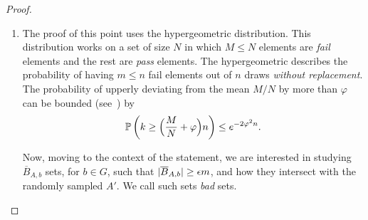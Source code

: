 \begin{lemma}
\begin{enumerate}[label={\Roman*}., ref={\Roman*}, font=\rmfamily]
            \end{enumerate}
            \begin{proof}
            \begin{enumerate}[label={\Roman*}., ref={\Roman*}, font=\rmfamily]
                \item The proof of this point uses the hypergeometric distribution.
                    This distribution works on a set of size $N$ in which $M \leq N$ elements are \emph{fail} elements
                    and the rest are \emph{pass} elements.
                    The hypergeometric describes the probability of having $m \leq n$ fail elements out of $n$ draws
                    \emph{without replacement}.
                    The probability of upperly deviating from the mean $M/N$ by more than $\varphi$ can be bounded
                    (see~\cite{hypergeometric_tail_inequalities_ending_the_insanity, the_tail_od_the_hypergeometric_distribution})
                    by
                    \begin{equation} \label{eq:hypergeometric_bound}
                        \mathbb{P}\left( k \geq \Bigl( \frac{M}{N} + \varphi \Bigr) n \right) \leq e^{-2 \varphi^2 n}.
                    \end{equation}

                    Now, moving to the context of the statement, we are interested in studying $\overline{B}_{A,b}$ sets,
                    for $b\in G$, such that $| \overline{B}_{A,b} | \geq \epsilon m$, and how they intersect with the
                    randomly sampled $A'$.
                    We call such sets \emph{bad} sets.


\end{enumerate}
\end{proof}
\end{lemma}
